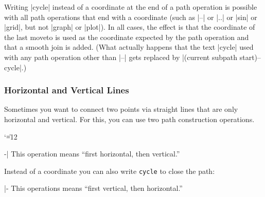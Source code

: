 Writing |cycle| instead of a coordinate at the end of a path operation
is possible with all path operations that end with a coordinate (such
as |--| or |..| or |sin| or |grid|, but not |graph| or |plot|).
In all cases, the effect is that the coordinate of the last moveto is
used as the coordinate expected by the path operation and that a
smooth join is added. (What actually happens that the text |cycle|
used with any path operation other than |--| gets replaced by
|(current subpath start)--cycle|.)


\subsubsection{Horizontal and Vertical Lines}

Sometimes you want to connect two points via straight lines that are
only horizontal and vertical. For this, you can use two path
construction operations.

{\catcode`\|=12
\begin{pathoperation}[noindex]{-|}{}
  \pgfmanualpdflabel[\catcode`\|=12 ]{-|}{}%
  This operation means ``first horizontal, then vertical.''

\begin{codeexample}[]
\end{codeexample}
  Instead of a coordinate you can also write \verb!cycle! to close the
  path:
\begin{codeexample}[]
\end{codeexample}
\end{pathoperation}
\begin{pathoperation}[noindex]{|-}{}
  \pgfmanualpdflabel[\catcode`\|=12 ]{|-}{}%
  This operations means  ``first vertical, then horizontal.''
\end{pathoperation}
}


